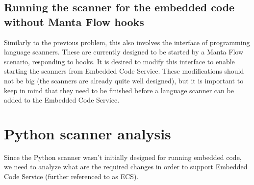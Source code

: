 \subsection{Running the scanner for the embedded code without Manta Flow hooks}
Similarly to the previous problem, this also involves the interface of programming language scanners. These are currently designed to be started by a Manta Flow scenario, responding to hooks. It is desired to modify this interface to enable starting the scanners from Embedded Code Service. These modifications should not be big (the scanners are already quite well designed), but it is important to keep in mind that they need to be finished before a language scanner can be added to the Embedded Code Service. 






\section{Python scanner analysis}

Since the Python scanner wasn't initially designed for running embedded code, we need to analyze what are the required changes in order to support Embedded Code Service (further referenced to as ECS).

